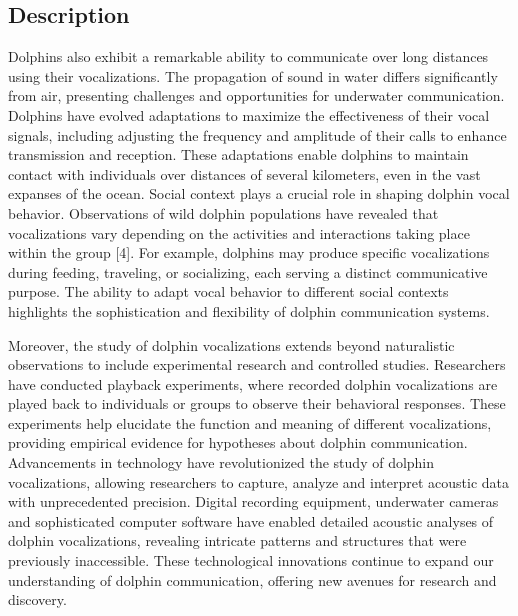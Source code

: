 \documentclass{article}
\begin{document}
\begin{multicols}{2}
\section*{Description}

Dolphins also exhibit a remarkable ability to communicate over long distances using their vocalizations. The propagation of sound in water differs significantly from air, presenting challenges and opportunities for underwater communication. Dolphins have evolved adaptations to maximize the effectiveness of their vocal signals, including adjusting the frequency and amplitude of their calls to enhance transmission and reception. These adaptations enable dolphins to maintain contact with individuals over distances of several kilometers, even in the vast expanses of the ocean. Social context plays a crucial role in shaping dolphin vocal behavior. Observations of wild dolphin populations have revealed that vocalizations vary depending on the activities and interactions taking place within the group [4]. For example, dolphins may produce specific vocalizations during feeding, traveling, or socializing, each serving a distinct communicative purpose. The ability to adapt vocal behavior to different social contexts highlights the sophistication and flexibility of dolphin communication systems.

Moreover, the study of dolphin vocalizations extends beyond naturalistic observations to include experimental research and controlled studies. Researchers have conducted playback experiments, where recorded dolphin vocalizations are played back to individuals or groups to observe their behavioral responses. These experiments help elucidate the function and meaning of different vocalizations, providing empirical evidence for hypotheses about dolphin communication. Advancements in technology have revolutionized the study of dolphin vocalizations, allowing researchers to capture, analyze and interpret acoustic data with unprecedented precision. Digital recording equipment, underwater cameras and sophisticated computer software have enabled detailed acoustic analyses of dolphin vocalizations, revealing intricate patterns and structures that were previously inaccessible. These technological innovations continue to expand our understanding of dolphin communication, offering new avenues for research and discovery.


\end{multicols}
\end{document}
